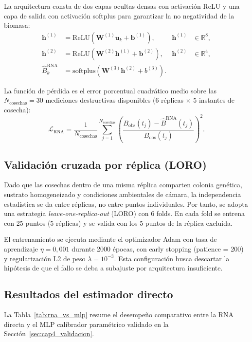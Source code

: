 La arquitectura consta de dos capas ocultas densas con activación ReLU y una capa de salida con activación softplus para garantizar la no negatividad de la biomasa:
\begin{align}
\mathbf{h}^{(1)} &= \mathrm{ReLU}\left(\mathbf{W}^{(1)}\mathbf{u}_k + \mathbf{b}^{(1)}\right), & \mathbf{h}^{(1)} &\in \mathbb{R}^8, \\
\mathbf{h}^{(2)} &= \mathrm{ReLU}\left(\mathbf{W}^{(2)}\mathbf{h}^{(1)} + \mathbf{b}^{(2)}\right), & \mathbf{h}^{(2)} &\in \mathbb{R}^4, \\
\hat{B}_k^{\mathrm{RNA}} &= \mathrm{softplus}\left(\mathbf{W}^{(3)}\mathbf{h}^{(2)} + b^{(3)}\right).
\end{align}

La función de pérdida es el error porcentual cuadrático medio sobre las $N_{\mathrm{cosechas}} = 30$ mediciones destructivas disponibles (6 réplicas $\times$ 5 instantes de cosecha):
\begin{equation}
\mathcal{L}_{\mathrm{RNA}} = \frac{1}{N_{\mathrm{cosechas}}}\sum_{j=1}^{N_{\mathrm{cosechas}}} \left( \frac{B_{\mathrm{obs}}(t_j) - \hat{B}^{\mathrm{RNA}}(t_j)}{B_{\mathrm{obs}}(t_j)} \right)^2.
\end{equation}

\subsection{Validación cruzada por réplica (LORO)}
\label{subsec:rna_b_loro}
Dado que las cosechas dentro de una misma réplica comparten colonia genética, sustrato homogeneizado y condiciones ambientales de cámara, la independencia estadística se da entre réplicas, no entre puntos individuales. Por tanto, se adopta una estrategia \emph{leave-one-replica-out} (LORO) con 6 folds. En cada fold se entrena con 25 puntos (5 réplicas) y se valida con los 5 puntos de la réplica excluida.

El entrenamiento se ejecuta mediante el optimizador Adam con tasa de aprendizaje $\eta = 0{,}001$ durante 2000 épocas, con early stopping (patience = 200) y regularización L2 de peso $\lambda = 10^{-3}$. Esta configuración busca descartar la hipótesis de que el fallo se deba a subajuste por arquitectura insuficiente.

\subsection{Resultados del estimador directo}
\label{subsec:rna_b_resultados}
La Tabla~\ref{tab:rna_vs_mlp} resume el desempeño comparativo entre la RNA directa y el MLP calibrador paramétrico validado en la Sección~\ref{sec:cap4_validacion}.

